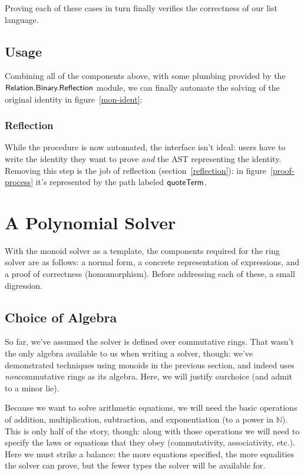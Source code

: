 \documentclass[draft, twocolumn]{article}
\theoremstyle{definition}
\theoremstyle{definition}
\begin{document}
Proving each of these cases in turn finally verifies the correctness of our list
language.
\subsection{Usage}
Combining all of the components above, with some plumbing provided by the
\(\AgdaModule{Relation.Binary.Reflection}\) module, we can finally automate the
solving of the original identity in figure~\ref{mon-ident}:
\subsubsection{Reflection}
While the procedure is now automated, the interface isn't ideal: users have to
write the identity they want to prove \emph{and} the AST representing the
identity. Removing this step is the job of reflection
(section~\ref{reflection}): in figure~\ref{proof-process} it's represented by
the path labeled \(\AgdaKeyword{quoteTerm}\).
\section{A Polynomial Solver}
With the monoid solver as a template, the components required for the ring
solver are as follows: a normal form, a concrete representation of
expressions, and a proof of correctness (homomorphism). Before addressing each
of these, a small digression.
\subsection{Choice of Algebra}
So far, we've assumed the solver is defined over commutative rings. That wasn't
the only algebra available to us when writing a solver, though: we've
demonstrated techniques using monoids in the previous section, and
indeed\cite{geuvers_automatically_2017} uses \emph{non}commutative rings as its
algebra. Here, we will justify our\footnotemark choice (and admit to a minor lie).

Because we want to solve arithmetic equations, we will need the basic operations
of addition, multiplication, subtraction, and exponentiation (to a power in
\(\mathbb{N}\)). This is only half of the story, though: along with those
operations we will need to specify the laws or equations that they obey
(commutativity, associativity, etc.). Here we must strike a balance: the more
equations specified, the more equalities the solver can prove, but the fewer
types the solver will be available for.
\end{document}

